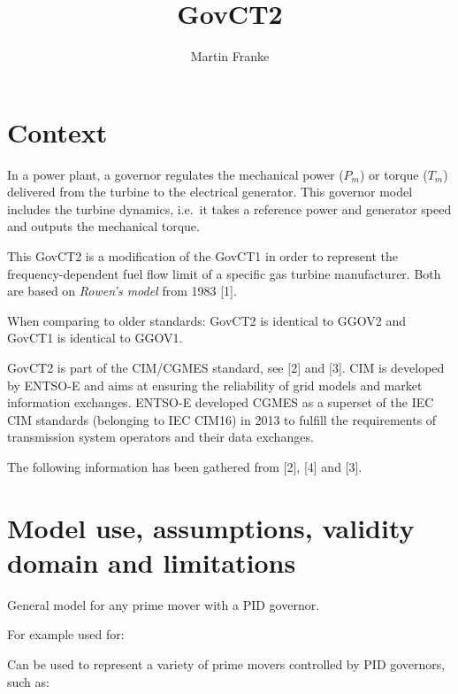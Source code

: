 \documentclass[
  a4paper,
  DIV=11,
  numbers=noendperiod]{scrartcl}
\title{GovCT2}
\author{Martin Franke}
\date{}
\renewcommand*\contentsname{Table of contents}
\newcommand\contentsname{Table of contents}
\begin{document}
\maketitle

\renewcommand*\contentsname{Table of contents}
{
\hypersetup{linkcolor=}
\setcounter{tocdepth}{3}
\tableofcontents
}
\listoffigures
\listoftables

\section{Context}\label{context}

In a power plant, a governor regulates the mechanical power (\(P_m\)) or
torque (\(T_m\)) delivered from the turbine to the electrical generator.
This governor model includes the turbine dynamics, i.e.~it takes a
reference power and generator speed and outputs the mechanical torque.

This GovCT2 is a modification of the GovCT1 in order to represent the
frequency-dependent fuel flow limit of a specific gas turbine
manufacturer. Both are based on \emph{Rowen's model} from 1983 {[}1{]}.

When comparing to older standards: GovCT2 is identical to GGOV2 and
GovCT1 is identical to GGOV1.

GovCT2 is part of the CIM/CGMES standard, see {[}2{]} and {[}3{]}. CIM
is developed by ENTSO-E and aims at ensuring the reliability of grid
models and market information exchanges. ENTSO-E developed CGMES as a
superset of the IEC CIM standards (belonging to IEC CIM16) in 2013 to
fulfill the requirements of transmission system operators and their data
exchanges.

The following information has been gathered from {[}2{]}, {[}4{]} and
{[}3{]}.

\section{Model use, assumptions, validity domain and
limitations}\label{model-use-assumptions-validity-domain-and-limitations}

General model for any prime mover with a PID governor.

For example used for:

Can be used to represent a variety of prime movers controlled by PID
governors, such as:
\end{document}
